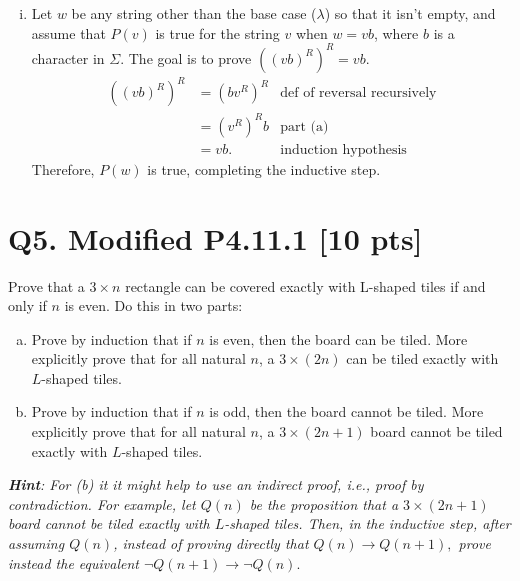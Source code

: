 \documentclass[12pt]{article}
\begin{document}
\begin{enumerate}[(a)]
\begin{enumerate}[(i)]
				\item Let $w$ be any string other than the base case ($\lambda$) so that
					it isn't empty, and assume that $P(v)$ is true for the string $v$ when
					$w=vb$, where $b$ is a character in $\Sigma$. The goal is to prove
					$((vb)^{R})^{R}=vb$.
					\begin{align*}
						((vb)^{R})^{R} & = (bv^{R})^{R}  & \text{def of reversal recursively} \\
						               & = (v^{R})^{R} b & \text{part (a)}                    \\
						               & = vb.           & \text{induction hypothesis}
					\end{align*}
					Therefore, $P(w)$ is true, completing the inductive step.
			\end{enumerate}
	\end{enumerate}

	\newpage

	\section*{\textbf{Q5. Modified P4.11.1} [10 pts]}
	Prove that a $3 \times n$ rectangle can be covered exactly with L-shaped tiles
	if and only if $n$ is even. Do this in two parts:

	\begin{enumerate}[(a)]
		\item Prove by induction that if $n$ is even, then the board can be tiled. More
			explicitly prove that for all natural $n$, a $3 \times (2n)$ can be tiled
			exactly with $L$-shaped tiles.

		\item Prove by induction that if $n$ is odd, then the board cannot be tiled.
			More explicitly prove that for all natural $n$, a $3 \times (2n+1)$ board
			cannot be tiled exactly with $L$-shaped tiles.
	\end{enumerate}

	{\em \textbf{Hint}: For (b) it it might help to use an indirect proof, i.e., proof by contradiction. For example, let $Q(n)$ be the proposition that a $3 \times (2n+1)$ board cannot be tiled exactly with $L$-shaped tiles. Then, in the inductive step, after assuming $Q(n)$, instead of proving directly that $Q(n) \rightarrow Q(n+1),$ prove instead the equivalent $\neg Q(n+1)\rightarrow \neg Q(n).$ }
\end{document}

